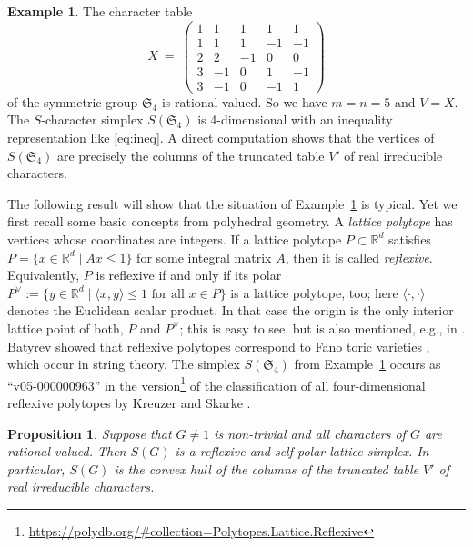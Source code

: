 \documentclass[12pt,leqno,a4paper]{amsart}
\newcommand{\RR}{{\mathbb{R}}}
\newcommand{\fS}{{\mathfrak{S}}} %
\newcommand{\polyDB}{{\sf{polyDB}}\xspace}
\newtheorem{prop}[thm]{Proposition}
\theoremstyle{definition}
\newtheorem{exmp}[thm]{Example}
\begin{document}
\begin{exmp} \label{exmp:S4}
  The character table
  \[
    X \ = \ 
    \begin{pmatrix}
      1 & 1 & 1 & 1 & 1 \\
      1 & 1 & 1 & -1 & -1 \\
      2 & 2 & -1 & 0 & 0 \\
      3 & -1 & 0 & 1 & -1 \\
      3 & -1 & 0 & -1 & 1
    \end{pmatrix}
  \]
  of the symmetric group $\fS_4$ is rational-valued.
  So we have $m=n=5$ and $V=X$.
  The $S$-character simplex $S(\fS_4)$ is 4-dimensional with an inequality
  representation like \eqref{eq:ineq}.
  A direct computation shows that the vertices of $S(\fS_4)$ are precisely the columns of the truncated table $V'$ of real irreducible characters.
\end{exmp}

The following result will show that the situation of Example~\ref{exmp:S4} is
typical. Yet we first recall some basic concepts from polyhedral geometry.
A \emph{lattice polytope} has vertices whose coordinates are integers.
If a lattice polytope $P\subset\RR^d$ satisfies $P=\{ x\in\RR^d\mid A x\leq 1 \}$
for some integral matrix $A$, then it is called \emph{reflexive}.
Equivalently, $P$ is reflexive if and only if its polar
$P^\vee := \{ y\in\RR^d \mid \langle x,y\rangle \leq 1 \text{ for all } x\in P\}$
is a lattice polytope, too; here $\langle \cdot,\cdot\rangle$ denotes the
Euclidean scalar product. In that case the origin is the only interior lattice
point of both, $P$ and $P^\vee$; this is easy to see, but is also mentioned,
e.g., in \cite[Thm~4.1.9(iii)]{Bat}. Batyrev showed that reflexive polytopes
correspond to Fano toric varieties \cite{Bat}, which occur in string theory.
The simplex $S(\fS_4)$ from Example~\ref{exmp:S4} occurs as
\enquote{v05-000000963} in the \polyDB \cite{polydb} version\footnote{\url{https://polydb.org/#collection=Polytopes.Lattice.Reflexive}} of the classification of all four-dimensional reflexive polytopes by Kreuzer and Skarke \cite{KS}.

\begin{prop}   \label{prop:rational}
  Suppose that $G\neq 1$ is non-trivial and all characters of $G$ are
  rational-valued. Then $S(G)$ is a reflexive and self-polar lattice simplex.
  In particular, $S(G)$ is the convex hull of the columns of the truncated table
  $V'$ of real irreducible characters.
\end{prop}
\end{document}
